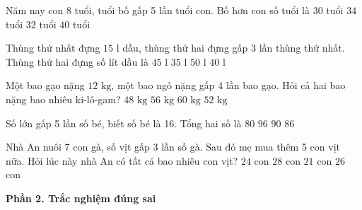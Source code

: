 \begin{ex} %
Năm nay con 8 tuổi, tuổi bố gấp 5 lần tuổi con. Bố hơn con số tuổi là
\choice
{$30$ tuổi}
{$34$ tuổi}
{\True $32$ tuổi}
{$40$ tuổi}
\end{ex}

\begin{ex} %
Thùng thứ nhất đựng $15\text{ l}$ dầu, thùng thứ hai đựng gấp 3 lần thùng thứ nhất. Thùng thứ hai đựng số lít dầu là
\choice
{\True $45\text{ l}$}
{$35\text{ l}$}
{$50\text{ l}$}
{$40\text{ l}$}
\end{ex}

\begin{ex} %
Một bao gạo nặng $12\text{ kg}$, một bao ngô nặng gấp 4 lần bao gạo. Hỏi cả hai bao nặng bao nhiêu ki-lô-gam?
\choice
{$48\text{ kg}$}
{$56\text{ kg}$}
{\True $60\text{ kg}$}
{$52\text{ kg}$}
\end{ex}

\begin{ex} %
Số lớn gấp 5 lần số bé, biết số bé là 16. Tổng hai số là
\choice
{$80$}
{\True $96$}
{$90$}
{$86$}
\end{ex}

\begin{ex} %
Nhà An nuôi 7 con gà, số vịt gấp 3 lần số gà. Sau đó mẹ mua thêm 5 con vịt nữa. Hỏi lúc này nhà An có tất cả bao nhiêu con vịt?
\choice
{$24$ con}
{$28$ con}
{$21$ con}
{\True $26$ con}
\end{ex}

\textbf{Phần 2. Trắc nghiệm đúng sai}

